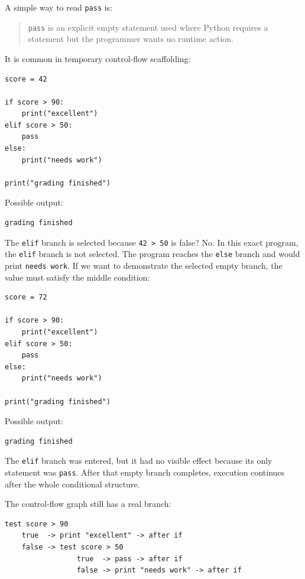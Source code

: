 \documentclass[a4paper,twoside]{report}
\begin{document}
A simple way to read \texttt{pass} is:

\begin{quote}
\texttt{pass} is an explicit empty statement used where Python requires a statement but the programmer wants no runtime action.
\end{quote}

It is common in temporary control-flow scaffolding:

\begin{verbatim}
score = 42

if score > 90:
    print("excellent")
elif score > 50:
    pass
else:
    print("needs work")

print("grading finished")
\end{verbatim}

Possible output:

\begin{verbatim}
grading finished
\end{verbatim}

The \texttt{elif} branch is selected because \texttt{42 > 50} is false? No. In this exact program, the \texttt{elif} branch is not selected. The program reaches the \texttt{else} branch and would print \texttt{needs work}. If we want to demonstrate the selected empty branch, the value must satisfy the middle condition:

\begin{verbatim}
score = 72

if score > 90:
    print("excellent")
elif score > 50:
    pass
else:
    print("needs work")

print("grading finished")
\end{verbatim}

Possible output:

\begin{verbatim}
grading finished
\end{verbatim}

The \texttt{elif} branch was entered, but it had no visible effect because its only statement was \texttt{pass}. After that empty branch completes, execution continues after the whole conditional structure.

The control-flow graph still has a real branch:

\begin{verbatim}
test score > 90
    true  -> print "excellent" -> after if
    false -> test score > 50
                 true  -> pass -> after if
                 false -> print "needs work" -> after if
\end{verbatim}
\end{document}

